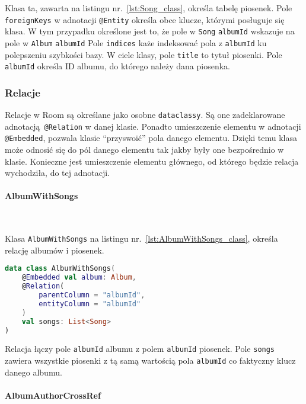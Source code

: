 Klasa ta, zawarta na listingu nr.~\ref{lst:Song_class}, określa tabelę piosenek. Pole \texttt{foreignKeys} w adnotacji \texttt{@Entity} określa obce klucze, którymi posługuje się klasa. W tym przypadku określone jest to, że pole w \texttt{Song} \texttt{albumId} wskazuje na pole w \texttt{Album} \texttt{albumId} Pole \texttt{indices} każe indeksować pola z \texttt{albumId} ku polepszeniu szybkości bazy. W ciele klasy, pole \texttt{title} to tytuł piosenki. Pole \texttt{albumId} określa ID albumu, do którego należy dana piosenka. 

\subsubsection{Relacje} \label{sec:relations}

Relacje w Room są określane jako osobne \texttt{dataclassy}. Są one zadeklarowane adnotacją \texttt{@Relation} w danej klasie. Ponadto umieszczenie elementu w adnotacji \texttt{@Embedded}, pozwala klasie \enquote{przyswoić} pola danego elementu. Dzięki temu klasa może odnosić się do pól danego elementu tak jakby były one bezpośrednio w klasie. Konieczne jest umieszczenie elementu głównego, od którego będzie relacja wychodziła, do tej adnotacji.

\paragraph{AlbumWithSongs} \label{sec:albumwithsongs} \

Klasa \texttt{AlbumWithSongs} na listingu nr.~\ref{lst:AlbumWithSongs_class}, określa relację albumów i piosenek. 

\begin{lstlisting}[caption=Deklaracja relacji \texttt{AlbumWithSongs}, label={lst:AlbumWithSongs_class}, language=kotlin]
data class AlbumWithSongs(
    @Embedded val album: Album,
    @Relation(
        parentColumn = "albumId",
        entityColumn = "albumId"
    )
    val songs: List<Song>
)
\end{lstlisting}

Relacja łączy pole \texttt{albumId} albumu z polem \texttt{albumId} piosenek. Pole \texttt{songs} zawiera wszystkie piosenki z tą samą wartością pola \texttt{albumId} co faktyczny klucz danego albumu.

\paragraph{AlbumAuthorCrossRef} \label{sec:AlbumAuthorCrossRef}

